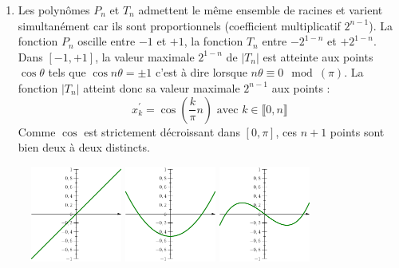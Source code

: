 \begin{enumerate}
\begin{enumerate}
\item Les polynômes $P_n$ et $T_n$ admettent le même ensemble de racines et varient simultanément car ils sont proportionnels (coefficient multiplicatif $2^{n-1}$). La fonction $P_n$ oscille entre $-1$ et $+1$, la fonction $T_n$ entre $-2^{1-n}$ et $+2^{1-n}$.\newline
Dans $[-1,+1]$, la valeur maximale $2^{1-n}$ de $|T_n|$ est atteinte aux points $\cos \theta$ tels que $\cos n\theta = \pm1$ c'est à dire lorsque $n\theta \equiv 0 \mod(\pi)$. La fonction $|T_n|$ atteint donc sa valeur maximale $2^{n-1}$ aux points :
\begin{displaymath}
x_k^\prime = \cos(\frac{k}{\pi}n)\text{ avec } k\in \llbracket 0,n\rrbracket
\end{displaymath}
Comme $\cos$ est strictement décroissant dans $[0,\pi]$, ces $n+1$ points sont bien deux à deux distincts.
\end{enumerate}
\begin{figure}
 \centering
 \includegraphics[width=3cm]{Cchebydiam_1.pdf}\hspace{0.2cm}
 \includegraphics[width=3cm]{Cchebydiam_2.pdf}\hspace{0.2cm}
 \includegraphics[width=3cm]{Cchebydiam_3.pdf}\hspace{0.2cm}

\end{figure}
\end{enumerate}
